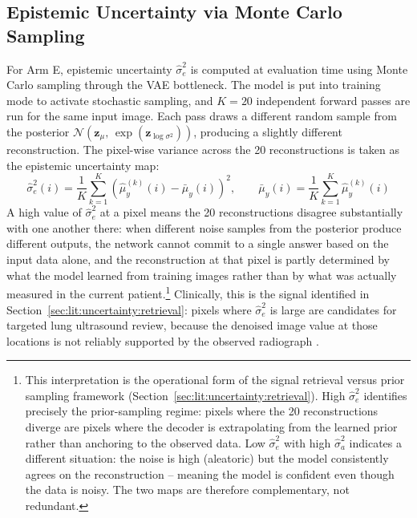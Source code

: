 \documentclass[12pt, a4paper, twoside, openright]{book}
\begin{document}
\subsection{Epistemic Uncertainty via Monte Carlo Sampling}
\label{sec:methods:architecture:epistemic}

For Arm E, epistemic uncertainty $\hat{\sigma}^2_e$ is computed at evaluation time using Monte Carlo sampling
through the VAE bottleneck. The model is put into training mode to activate stochastic
sampling, and $K = 20$ independent forward passes are run for the same input image.
Each pass draws a different random sample from the posterior
$\mathcal{N}(\mathbf{z}_\mu,\,\exp(\mathbf{z}_{\log\sigma^2}))$, producing a slightly
different reconstruction. The pixel-wise variance across the 20 reconstructions is taken as
the epistemic uncertainty map:
\begin{equation}
\label{eq:methods:epistemic}
\hat{\sigma}^2_e(i) = \frac{1}{K}\sum_{k=1}^{K}\!\left(\hat{\mu}^{(k)}_y(i) - \bar{\mu}_y(i)\right)^2,
\qquad \bar{\mu}_y(i) = \frac{1}{K}\sum_{k=1}^{K}\hat{\mu}^{(k)}_y(i)
\end{equation}
A high value of $\hat{\sigma}^2_e$ at a pixel means the 20 reconstructions disagree substantially with one another there: when different noise samples from the posterior produce different outputs, the network cannot commit to a single answer based on the input data alone, and the reconstruction at that pixel is partly determined by what the model learned from training images rather than by what was actually measured in the current patient.\footnote{This interpretation is the operational form of the signal retrieval versus prior sampling framework (Section~\ref{sec:lit:uncertainty:retrieval}). High $\hat{\sigma}^2_e$ identifies precisely the prior-sampling regime: pixels where the 20 reconstructions diverge are pixels where the decoder is extrapolating from the learned prior rather than anchoring to the observed data. Low $\hat{\sigma}^2_e$ with high $\hat{\sigma}^2_a$ indicates a different situation: the noise is high (aleatoric) but the model consistently agrees on the reconstruction -- meaning the model is confident even though the data is noisy. The two maps are therefore complementary, not redundant.} Clinically, this is the
signal identified in Section~\ref{sec:lit:uncertainty:retrieval}: pixels where
$\hat{\sigma}^2_e$ is large are candidates for targeted lung ultrasound review, because
the denoised image value at those locations is not reliably supported by the observed
radiograph \cite{lovrenski_esr_2025}.
\end{document}
